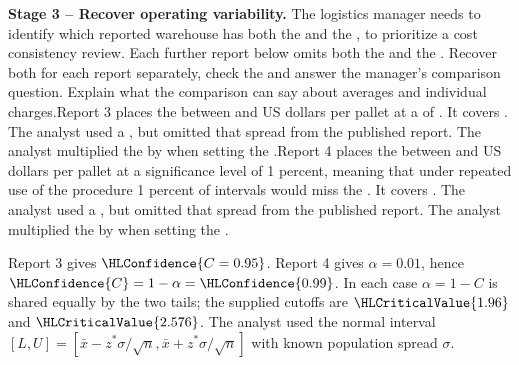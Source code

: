 \textbf{Stage 3 -- Recover operating variability.} The logistics manager needs to identify which reported warehouse has both the   and the  , to prioritize a cost consistency review. Each further report below omits both the   and the  . Recover both for each report separately, check the  and answer the manager's comparison question. Explain what the comparison can say about averages and individual charges.\newline Report 3 places the  between  and  US dollars per pallet at a  of . It covers . The analyst used a   , but omitted that spread from the published report. The analyst multiplied the   by  when setting the   .\newline Report 4 places the  between  and  US dollars per pallet at a significance level of 1 percent, meaning that under repeated use of the procedure 1 percent of intervals would miss the . It covers . The analyst used a   , but omitted that spread from the published report. The analyst multiplied the   by  when setting the   .
\par\endgroup

\begingroup
\setlength{\abovedisplayskip}{6pt}
\setlength{\belowdisplayskip}{6pt}
\setlength{\abovedisplayshortskip}{3pt}
\setlength{\belowdisplayshortskip}{4pt}
\setlength{\parskip}{4pt}

Report 3 gives $\HLConfidence{C=0.95}$. Report 4 gives $\alpha=0.01$, hence $\HLConfidence{C}=1-\alpha=\HLConfidence{0.99}$. In each case $\alpha=1-C$ is shared equally by the two tails; the supplied cutoffs are $\HLCriticalValue{1.96}$ and $\HLCriticalValue{2.576}$. The analyst used the normal interval $[L,U]=[\bar x-z^*\sigma/\sqrt n,\bar x+z^*\sigma/\sqrt n]$ with known population spread $\sigma$.

